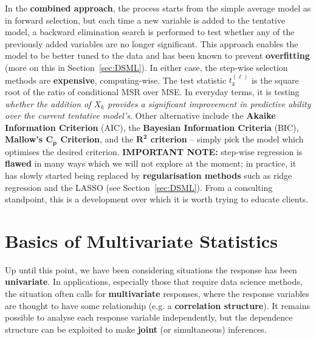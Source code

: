 \newpage\noindent
In the \textbf{combined approach}, the process starts from the simple average model as in forward selection, but each time a new variable is added to the tentative model, a backward elimination search is performed to test whether any of the previously added variables are no longer significant. This approach enables the model to be better tuned to the data and has been known to prevent \textbf{overfitting} (more on this in Section~\ref{sec:DSML}). In either case, the step-wise selection methods are \textbf{expensive}, computing-wise. 
\newl The test statistic $t^{(\ell)}_{k}$ is the square root of the ratio of conditional MSR over MSE. In everyday terms, it is testing \textit{whether the addition of $X_{k}$ provides a significant improvement in predictive ability over the current tentative model's}. Other alternative include the \textbf{Akaike Information Criterion} (AIC), the \textbf{Bayesian Information Criteria} (BIC), \textbf{Mallow's $\bm{C_{p}}$ Criterion}, and the \textbf{$\bm{R^2}$ criterion} -- simply pick the model which optimises the desired criterion. \newl \textbf{IMPORTANT NOTE:} step-wise regression is \textbf{flawed} in many ways which we will not explore at the moment; in practice, it has slowly started being replaced by \textbf{regularisation methods} such as ridge regression and the LASSO (see Section~\ref{sec:DSML}). From a consulting standpoint, this is a development over which it is worth trying to educate clients. 


\section{Basics of Multivariate Statistics}\label{sec: Multi.Stat}
Up until this point, we have been considering situations the response has been \textbf{univariate}. In applications, especially those that require data science methods, the situation often calls for \textbf{multivariate} responses,  where the response variables are thought to have some relationship (e.g. a \textbf{correlation structure}). It remains possible to analyse each response variable independently, but the dependence structure can be exploited to make \textbf{joint} (or simultaneous) inferences.

